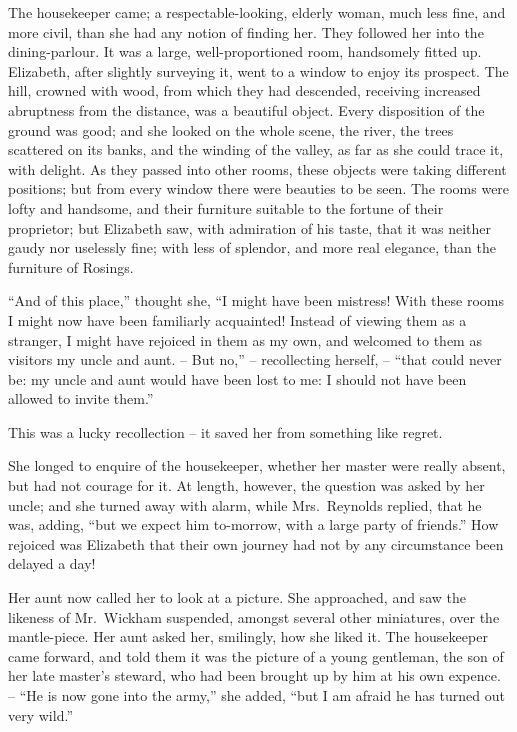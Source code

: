 The housekeeper came; a respectable-looking, elderly
woman, much less fine, and more civil, than she had any
notion of finding her. They followed her into the dining-parlour.
It was a large, well-proportioned room, handsomely
fitted up. Elizabeth, after slightly surveying it,
went to a window to enjoy its prospect. The hill, crowned
with wood, from which they had descended, receiving
increased abruptness from the distance, was a beautiful
object. Every disposition of the ground was good; and
she looked on the whole scene, the river, the trees scattered
on its banks, and the winding of the valley, as far as she
could trace it, with delight. As they passed into other
rooms, these objects were taking different positions; but
from every window there were beauties to be seen. The
rooms were lofty and handsome, and their furniture
suitable to the fortune of their proprietor; but Elizabeth
saw, with admiration of his taste, that it was neither
gaudy nor uselessly fine; with less of splendor, and more
real elegance, than the furniture of Rosings.

“And of this place,” thought she, “I might have been
mistress! With these rooms I might now have been
familiarly acquainted! Instead of viewing them as a
stranger, I might have rejoiced in them as my own, and
welcomed to them as visitors my uncle and aunt. -- But
no,” -- recollecting herself, -- “that could never be: my
uncle and aunt would have been lost to me: I should
not have been allowed to invite them.”

This was a lucky recollection -- it saved her from something
like regret.

She longed to enquire of the housekeeper, whether her
master were really absent, but had not courage for it.
At length, however, the question was asked by her uncle;
and she turned away with alarm, while Mrs.\ Reynolds
replied, that he was, adding, “but we expect him
to-morrow, with a large party of friends.” How rejoiced
was Elizabeth that their own journey had not by any
circumstance been delayed a day!

Her aunt now called her to look at a picture. She
approached, and saw the likeness of Mr.\ Wickham suspended,
amongst several other miniatures, over the mantle-piece.
Her aunt asked her, smilingly, how she liked it.
The housekeeper came forward, and told them it was the
picture of a young gentleman, the son of her late master’s
steward, who had been brought up by him at his own
expence. -- “He is now gone into the army,” she added,
“but I am afraid he has turned out very wild.”

